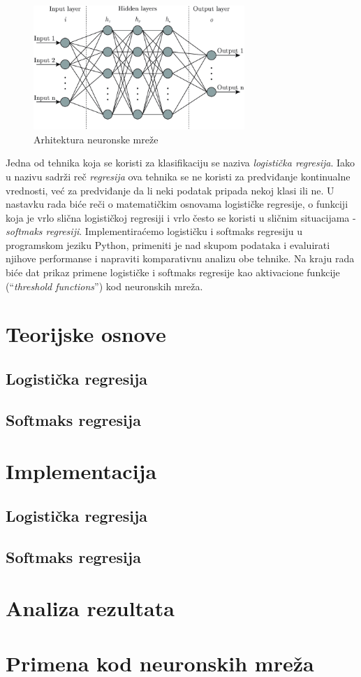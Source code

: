 \documentclass[a4paper,12pt]{report}
\begin{document}
\begin{figure}[ht]
	\centering
	\includegraphics[width=8cm]{neuronske_mreze.png}
	\caption{Arhitektura neuronske mreže}\label{fig:prettypic}
\end{figure}

Jedna od tehnika koja se koristi za klasifikaciju se naziva \textit{logistička regresija}. Iako u nazivu sadrži reč \textit{regresija} ova tehnika se ne koristi za predviđanje kontinualne vrednosti, već za predviđanje da li neki podatak pripada nekoj klasi ili ne. U nastavku rada biće reči o matematičkim osnovama logističke regresije, o funkciji koja je vrlo slična logističkoj regresiji i vrlo često se koristi u sličnim situacijama - \textit{softmaks regresiji}. Implementiraćemo logističku i softmaks regresiju u programskom jeziku Python, primeniti je nad skupom podataka i evaluirati njihove performanse i napraviti komparativnu analizu obe tehnike. Na kraju rada biće dat prikaz primene logističke i softmaks regresije kao 
aktivacione funkcije (\enquote {\textit{threshold functions}}) kod neuronskih mreža.
\chapter{Teorijske osnove}

\section{Logistička regresija}

\section{Softmaks regresija}

\chapter{Implementacija}

\section{Logistička regresija}

\section{Softmaks regresija}

\chapter{Analiza rezultata}

\chapter{Primena kod neuronskih mreža}
\end{document}
